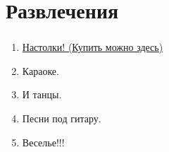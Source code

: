 \documentclass[t]{beamer}  %
\begin{document}
\section{Развлечения}
{
\begin{frame}
	\frametitle{\insertsection}
	\framesubtitle{\insertsubsection}
	\begin{enumerate}
		\item<1> \href{https://oz.by/}{Настолки! (Купить можно здесь)}
		\item<2-3> Караоке.
		\item<3> И танцы.
		\item<4> Песни под гитару.
		\item<1-3> Веселье!!!
	\end{enumerate}
\end{frame}
}
\end{document}
